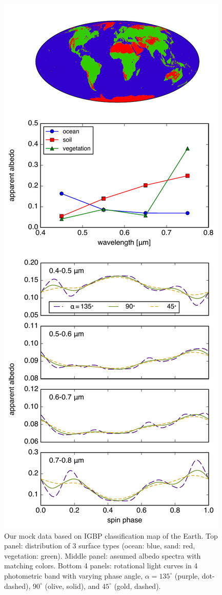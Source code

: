 \documentclass[iop,numberedappendix,apj]{emulateapj}
\begin{document}
\begin{figure}[h]
    \begin{center}
	\includegraphics[width=\hsize]{mockdata.pdf}
    \end{center}
    \caption{Our mock data based on IGBP classification map of the Earth. Top panel: distribution of 3 surface types (ocean: blue, sand: red, vegetation: green). Middle panel: assumed albedo spectra with matching colors. Bottom 4 panels: rotational light curves in 4 photometric band with varying phase angle, $\alpha = 135^{\circ }$ (purple, dot-dashed), $90^{\circ }$ (olive, solid), and $45^{\circ }$ (gold, dashed). }
\label{fig:mockdata}
\end{figure}
\end{document}
